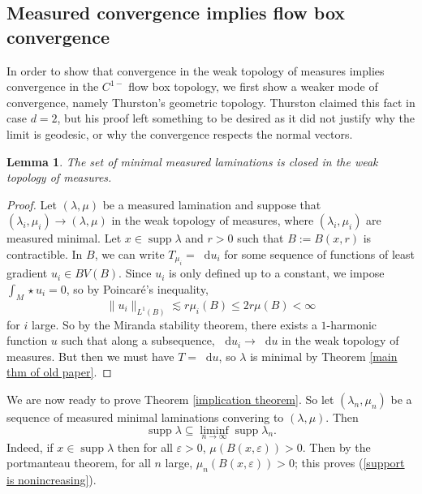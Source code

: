 \documentclass[reqno,11pt]{amsart}
\newcommand*\dif{\mathop{}\!\mathrm{d}}
\DeclareMathOperator{\supp}{supp}
\newtheorem{lemma}[theorem]{Lemma}
\theoremstyle{definition}
\numberwithin{equation}{section}
\begin{document}
\subsection{Measured convergence implies flow box convergence}
In order to show that convergence in the weak topology of measures implies convergence in the $C^{1-}$ flow box topology, we first show a weaker mode of convergence, namely Thurston's geometric topology.
Thurston claimed this fact \cite[Proposition 8.10.3]{thurston1979geometry} in case $d = 2$, but his proof left something to be desired as it did not justify why the limit is geodesic, or why the convergence respects the normal vectors.

\begin{lemma}\label{limits of measured geodesic lams are geodesic}
	The set of minimal measured laminations is closed in the weak topology of measures.
\end{lemma}
\begin{proof}
Let $(\lambda, \mu)$ be a measured lamination and suppose that $(\lambda_i, \mu_i) \to (\lambda, \mu)$ in the weak topology of measures, where $(\lambda_i, \mu_i)$ are measured minimal.
Let $x \in \supp \lambda$ and $r > 0$ such that $B := B(x, r)$ is contractible.
In $B$, we can write $T_{\mu_i} = \dif u_i$ for some sequence of functions of least gradient $u_i \in BV(B)$.
Since $u_i$ is only defined up to a constant, we impose $\int_M \star u_i = 0$, so by Poincar\'e's inequality,
$$\|u_i\|_{L^1(B)} \lesssim r\mu_i(B) \leq 2r \mu(B) < \infty$$
for $i$ large.
So by the Miranda stability theorem, there exists a $1$-harmonic function $u$ such that along a subsequence, $\dif u_i \to \dif u$ in the weak topology of measures.
But then we must have $T = \dif u$, so $\lambda$ is minimal by Theorem \ref{main thm of old paper}.
\end{proof}

We are now ready to prove Theorem \ref{implication theorem}.
So let $(\lambda_n, \mu_n)$ be a sequence of measured minimal laminations convering to $(\lambda, \mu)$.
Then
\begin{equation}\label{support is nonincreasing}
	\supp \lambda \subseteq \liminf_{n \to \infty} \supp \lambda_n.
\end{equation}
Indeed, if $x \in \supp \lambda$ then for all $\varepsilon > 0$, $\mu(B(x, \varepsilon)) > 0$.
Then by the portmanteau theorem, for all $n$ large, $\mu_n(B(x, \varepsilon)) > 0$; this proves (\ref{support is nonincreasing}).
\end{document}
